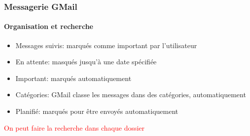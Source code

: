 \documentclass{beamer}
\begin{document}
\begin{frame}
\frametitle{Messagerie GMail}
\framesubtitle{Organisation et recherche}

\begin{minipage}{0.69\textwidth}
	\begin{itemize}
		\item Messages suivis: marqués comme important par l'utilisateur
		\item En attente: masqués jusqu'à une date spécifiée
		\item Important: marqués automatiquement 
		\item Catégories: GMail classe les messages dans des catégories, automatiquement
		\item Planifié: marqués pour être envoyés automatiquement
	\end{itemize}
	\textcolor{red}{On peut faire la recherche dans chaque dossier}
\end{minipage}
\begin{minipage}{0.26\textwidth}

\end{minipage}
\end{frame}
\end{document}
